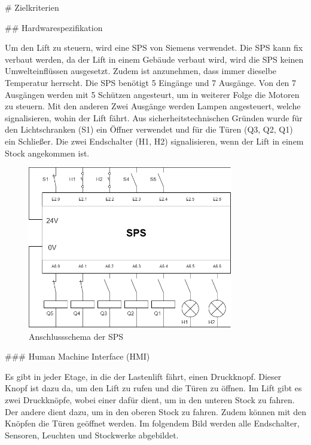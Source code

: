 \begin{markdown}
# Zielkriterien

## Hardwarespezifikation

Um den Lift zu steuern, wird eine SPS von Siemens verwendet. Die SPS kann fix verbaut werden, da der Lift in einem Gebäude verbaut wird, wird die SPS keinen Umwelteinflüssen ausgesetzt. Zudem ist anzunehmen, dass immer dieselbe Temperatur herrscht. Die SPS benötigt 5 Eingänge und 7 Ausgänge. Von den 7 Ausgängen werden mit 5 Schützen angesteurt, um in weiterer Folge die Motoren zu steuern. Mit den anderen Zwei Ausgänge werden Lampen angesteuert, welche signalisieren, wohin der Lift fährt. Aus sicherheitstechnischen Gründen wurde für den Lichtschranken (S1) ein Öffner verwendet und für die Türen (Q3, Q2, Q1) ein Schließer. Die zwei Endschalter (H1, H2) signalisieren, wenn der Lift in einem Stock angekommen ist.

\begin{figure}[H]
    \centering
    \includegraphics[width=0.8\textwidth]{./images/Anschlussschema.png}
    \caption[Anschlussschema der SPS]{Anschlussschema der SPS}
\end{figure}

### Human Machine Interface (HMI)

Es gibt in jeder Etage, in die der Lastenlift fährt, einen Druckknopf. Dieser Knopf ist dazu da, um den Lift zu rufen und die Türen zu öffnen. Im Lift gibt es zwei Druckknöpfe, wobei einer dafür dient, um in den unteren Stock zu fahren. Der andere dient dazu, um in den oberen Stock zu fahren. Zudem können mit den Knöpfen die Türen geöffnet werden. Im folgendem Bild werden alle Endschalter, Sensoren, Leuchten und Stockwerke abgebildet.


\end{markdown}
